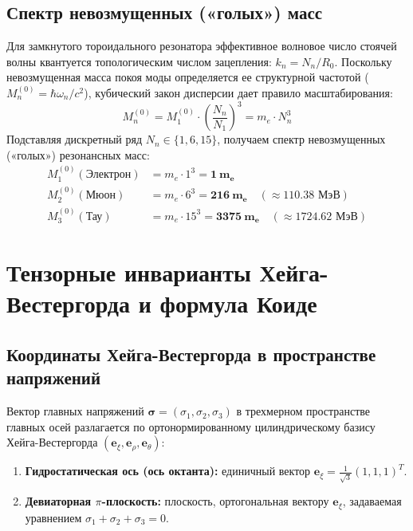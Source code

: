 \documentclass[12pt,a4paper]{article}
\begin{document}
	\subsection{Спектр невозмущенных («голых») масс}
	Для замкнутого тороидального резонатора эффективное волновое число стоячей волны квантуется топологическим числом зацепления: $k_n = N_n / R_0$.
	Поскольку невозмущенная масса покоя моды определяется ее структурной частотой ($M_n^{(0)} = \hbar \omega_n / c^2$), кубический закон дисперсии дает правило масштабирования:
	\begin{equation}
		M_n^{(0)} = M_1^{(0)} \cdot \left( \frac{N_n}{N_1} \right)^3 = m_e \cdot N_n^3
	\end{equation}
	Подставляя дискретный ряд $N_n \in \{1, 6, 15\}$, получаем спектр невозмущенных («голых») резонансных масс:
	\begin{align}
		M_1^{(0)} (\text{Электрон}) &= m_e \cdot 1^3  = \mathbf{1 \ m_e} \\
		M_2^{(0)} (\text{Мюон})     &= m_e \cdot 6^3  = \mathbf{216 \ m_e} \quad (\approx 110.38 \text{ МэВ}) \\
		M_3^{(0)} (\text{Тау})      &= m_e \cdot 15^3 = \mathbf{3375 \ m_e} \quad (\approx 1724.62 \text{ МэВ})
	\end{align}
	
	\section{Тензорные инварианты Хейга-Вестергорда и формула Коиде}
	
	\subsection{Координаты Хейга-Вестергорда в пространстве напряжений}
	Вектор главных напряжений $\boldsymbol{\sigma} = (\sigma_1, \sigma_2, \sigma_3)$ в трехмерном пространстве главных осей разлагается по ортонормированному цилиндрическому базису Хейга-Вестергорда $(\mathbf{e}_\xi, \mathbf{e}_\rho, \mathbf{e}_\theta)$:
	\begin{enumerate}
		\item \textbf{Гидростатическая ось (ось октанта):} единичный вектор $\mathbf{e}_\xi = \frac{1}{\sqrt{3}}(1, 1, 1)^T$.
		\item \textbf{Девиаторная $\pi$-плоскость:} плоскость, ортогональная вектору $\mathbf{e}_\xi$, задаваемая уравнением $\sigma_1 + \sigma_2 + \sigma_3 = 0$.
	\end{enumerate}
	
\end{document}
